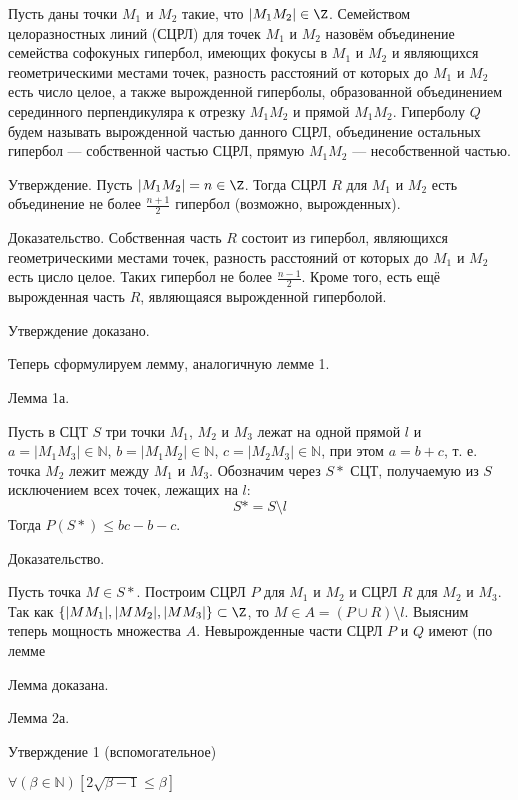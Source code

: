 \documentclass[a4paper,14pt]{article}
\begin{document}
\begin{opr}

Пусть даны точки $M_1$ и $M_2$ такие, что $|M_1 M_2|\in\Z$.
Семейством целоразностных линий (СЦРЛ) для точек $M_1$ и $M_2$ назовём объединение семейства софокуных гипербол,
имеющих фокусы в $M_1$ и $M_2$ и являющихся геометрическими местами точек, разность расстояний от которых до $M_1$ и $M_2$ есть число целое,
а также вырожденной гиперболы,
образованной объединением серединного перпендикуляра к отрезку $M_1 M_2$ и прямой $M_1 M_2$.
Гиперболу $Q$ будем называть вырожденной частью данного СЦРЛ,
объединение остальных гипербол --- собственной частью СЦРЛ,
прямую $M_1 M_2$ --- несобственной частью.

\end{opr}

Утверждение.
Пусть $|M_1 M_2|= n \in\Z$.
Тогда СЦРЛ $R$ для $M_1$ и $M_2$ есть объединение не более $\frac{n+1}{2}$ гипербол (возможно, вырожденных).

Доказательство.
Собственная часть $R$ состоит из гипербол, являющихся геометрическими местами точек,
разность расстояний от которых до $M_1$ и $M_2$ есть цисло целое.
Таких гипербол не более $\frac{n-1}{2}$.
Кроме того, есть ещё вырожденная часть $R$, являющаяся вырожденной гиперболой.

Утверждение доказано.

Теперь сформулируем лемму, аналогичную лемме 1.

Лемма 1а.

Пусть в СЦТ $S$ три точки $M_1$, $M_2$ и $M_3$ лежат на одной прямой $l$ и 
$a=|M_1 M_3| \in \mathbb{N}$,
$b=|M_1 M_2| \in \mathbb{N}$,
$c=|M_2 M_3| \in \mathbb{N}$,
при этом $a=b+c$, т. е. точка $M_2$ лежит между $M_1$ и $M_3$.
Обозначим через $S*$ СЦТ, получаемую из $S$ исключением всех точек, лежащих на $l$:
$$
S* = S \setminus l
$$
Тогда
$P(S*) \leq bc-b-c$.

Доказательство.

Пусть точка $M \in S*$.
Построим СЦРЛ $P$ для $M_1$ и $M_2$ и СЦРЛ $R$ для $M_2$ и $M_3$.
Так как $\{|M M_1|,|M M_2|,|M M_3|\}\subset\Z$, то $M\in A = (P\cup R)\setminus l$.
Выясним теперь мощность множества $A$.
Невырожденные части СЦРЛ $P$ и $Q$ имеют (по лемме 

Лемма доказана.

Лемма 2а.

Утверждение 1 (вспомогательное)

$\forall \left(\beta \in \mathbb N\right)\left[  2 \sqrt{\beta - 1} \leq \beta \right]$
\end{document}
